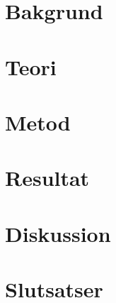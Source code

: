 \section{Bakgrund}
\label{sec:background-person}


\section{Teori}
\label{sec:theory-person}


\section{Metod}
\label{sec:method-person}


\section{Resultat}
\label{sec:results-person}


\section{Diskussion}
\label{sec:discussion-person}


\section{Slutsatser}
\label{sec:conclusions-person}


